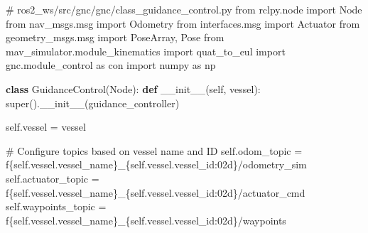 \documentclass[
  letterpaper,
  DIV=11,
  numbers=noendperiod]{scrreprt}
\newenvironment{Shaded}{\begin{snugshade}}{\end{snugshade}}
\newcommand{\BuiltInTok}[1]{\textcolor[rgb]{0.00,0.23,0.31}{#1}}
\newcommand{\CommentTok}[1]{\textcolor[rgb]{0.37,0.37,0.37}{#1}}
\newcommand{\FunctionTok}[1]{\textcolor[rgb]{0.28,0.35,0.67}{#1}}
\newcommand{\ImportTok}[1]{\textcolor[rgb]{0.00,0.46,0.62}{#1}}
\newcommand{\KeywordTok}[1]{\textcolor[rgb]{0.00,0.23,0.31}{\textbf{#1}}}
\newcommand{\NormalTok}[1]{\textcolor[rgb]{0.00,0.23,0.31}{#1}}
\newcommand{\OperatorTok}[1]{\textcolor[rgb]{0.37,0.37,0.37}{#1}}
\newcommand{\SpecialCharTok}[1]{\textcolor[rgb]{0.37,0.37,0.37}{#1}}
\newcommand{\SpecialStringTok}[1]{\textcolor[rgb]{0.13,0.47,0.30}{#1}}
\newcommand{\StringTok}[1]{\textcolor[rgb]{0.13,0.47,0.30}{#1}}
\newcommand{\VariableTok}[1]{\textcolor[rgb]{0.07,0.07,0.07}{#1}}
\begin{document}
\begin{Shaded}
\begin{Highlighting}[]
\CommentTok{\# ros2\_ws/src/gnc/gnc/class\_guidance\_control.py}
\ImportTok{from}\NormalTok{ rclpy.node }\ImportTok{import}\NormalTok{ Node}
\ImportTok{from}\NormalTok{ nav\_msgs.msg }\ImportTok{import}\NormalTok{ Odometry}
\ImportTok{from}\NormalTok{ interfaces.msg }\ImportTok{import}\NormalTok{ Actuator}
\ImportTok{from}\NormalTok{ geometry\_msgs.msg }\ImportTok{import}\NormalTok{ PoseArray, Pose}
\ImportTok{from}\NormalTok{ mav\_simulator.module\_kinematics }\ImportTok{import}\NormalTok{ quat\_to\_eul}
\ImportTok{import}\NormalTok{ gnc.module\_control }\ImportTok{as}\NormalTok{ con}
\ImportTok{import}\NormalTok{ numpy }\ImportTok{as}\NormalTok{ np}

\KeywordTok{class}\NormalTok{ GuidanceControl(Node):}
    \KeywordTok{def} \FunctionTok{\_\_init\_\_}\NormalTok{(}\VariableTok{self}\NormalTok{, vessel):}
        \BuiltInTok{super}\NormalTok{().}\FunctionTok{\_\_init\_\_}\NormalTok{(}\StringTok{\textquotesingle{}guidance\_controller\textquotesingle{}}\NormalTok{)}

        \VariableTok{self}\NormalTok{.vessel }\OperatorTok{=}\NormalTok{ vessel}
        
        \CommentTok{\# Configure topics based on vessel name and ID}
        \VariableTok{self}\NormalTok{.odom\_topic }\OperatorTok{=} \SpecialStringTok{f\textquotesingle{}}\SpecialCharTok{\{}\VariableTok{self}\SpecialCharTok{.}\NormalTok{vessel}\SpecialCharTok{.}\NormalTok{vessel\_name}\SpecialCharTok{\}}\SpecialStringTok{\_}\SpecialCharTok{\{}\VariableTok{self}\SpecialCharTok{.}\NormalTok{vessel}\SpecialCharTok{.}\NormalTok{vessel\_id}\SpecialCharTok{:02d\}}\SpecialStringTok{/odometry\_sim\textquotesingle{}}
        \VariableTok{self}\NormalTok{.actuator\_topic }\OperatorTok{=} \SpecialStringTok{f\textquotesingle{}}\SpecialCharTok{\{}\VariableTok{self}\SpecialCharTok{.}\NormalTok{vessel}\SpecialCharTok{.}\NormalTok{vessel\_name}\SpecialCharTok{\}}\SpecialStringTok{\_}\SpecialCharTok{\{}\VariableTok{self}\SpecialCharTok{.}\NormalTok{vessel}\SpecialCharTok{.}\NormalTok{vessel\_id}\SpecialCharTok{:02d\}}\SpecialStringTok{/actuator\_cmd\textquotesingle{}}
        \VariableTok{self}\NormalTok{.waypoints\_topic }\OperatorTok{=} \SpecialStringTok{f\textquotesingle{}}\SpecialCharTok{\{}\VariableTok{self}\SpecialCharTok{.}\NormalTok{vessel}\SpecialCharTok{.}\NormalTok{vessel\_name}\SpecialCharTok{\}}\SpecialStringTok{\_}\SpecialCharTok{\{}\VariableTok{self}\SpecialCharTok{.}\NormalTok{vessel}\SpecialCharTok{.}\NormalTok{vessel\_id}\SpecialCharTok{:02d\}}\SpecialStringTok{/waypoints\textquotesingle{}}
        

\end{Highlighting}
\end{Shaded}
\end{document}
